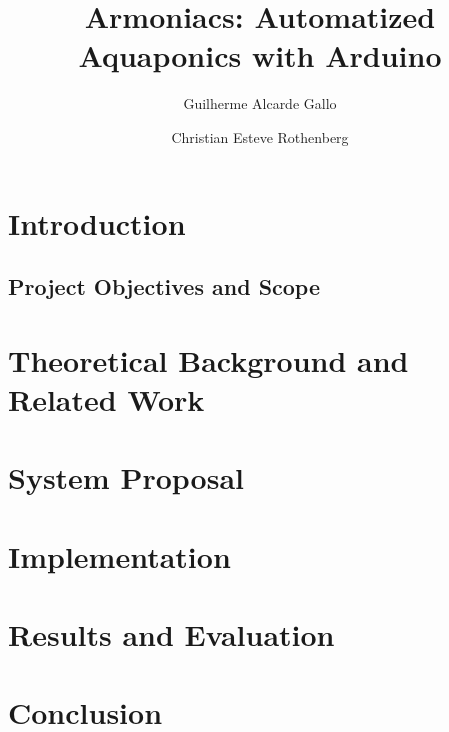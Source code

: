 \documentclass[10pt,a4paper]{article}
\title{Armoniacs: Automatized Aquaponics with Arduino}
\author{Guilherme Alcarde Gallo \and Christian Esteve Rothenberg 
}
\begin{document}
\maketitle

\newpage

\tableofcontents

\newpage

\section{Introduction}
\label{sec:introduction}


\subsection{Project Objectives and Scope}
\label{objectives}


\section{Theoretical Background and Related Work}
\label{fundamentals}


\section{System Proposal}
\label{proposal}


\section{Implementation}
\label{implementation}


\section{Results and Evaluation}
\label{evaluation}


\newpage
\section{Conclusion}
\label{conclusion}



% 


% 



\newpage
\nocite{useCaseStyle}
\printbibliography
\end{document}
